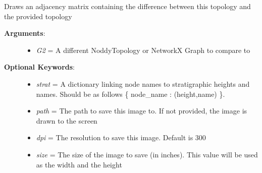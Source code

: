\documentclass[a4paper,10pt,english]{sphinxmanual}
\begin{document}
\begin{fulllineitems}
\begin{fulllineitems}
\begin{description}
\begin{itemize}
\end{itemize}

\end{description}

\end{fulllineitems}


\begin{fulllineitems}
\label{pynoddy:pynoddy.output.NoddyTopology.draw_difference_matrix}
Draws an adjacency matrix containing the difference between this topology and the provided topology
\begin{description}
\item[{\textbf{Arguments}:}] \leavevmode\begin{itemize}
\item {} 
\emph{G2} = A different NoddyTopology or NetworkX Graph to compare to

\end{itemize}

\item[{\textbf{Optional Keywords}:}] \leavevmode\begin{itemize}
\item {} 
\emph{strat} = A dictionary linking node names to stratigraphic heights and names. Should be as follows \{ node\_name : (height,name) \}.

\item {} 
\emph{path} = The path to save this image to. If not provided, the image is drawn to the screen

\item {} 
\emph{dpi} = The resolution to save this image. Default is 300

\item {} 
\emph{size} = The size of the image to save (in inches). This value will be used as the width and the height

\end{itemize}

\end{description}

\end{fulllineitems}



\end{fulllineitems}
\end{document}
